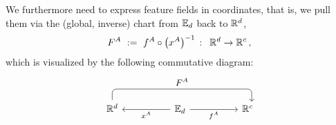 We furthermore need to express feature fields in coordinates, that is, we pull them via the (global, inverse) chart from $\mathbb{E}_d$ back to $\mathbb{R}^d$,
\begin{align}
    F^A\ :=\ f^A \circ \big(x^A \big)^{-1}\, :\,\ \mathbb{R}^d \to \mathbb{R}^c \,,
\end{align}
which is visualized by the following commutative diagram:
\begin{equation}\label{cd:feature_field_chart_pullback_Rd}
    \begin{tikzcd}[row sep=2.5em, column sep=5em]
        \R^d
            \arrow[rr, rounded corners, to path={ 
                    |- node[above, pos=.75]{\small$F^A$} ([yshift=3.ex, xshift=1ex]\tikztotarget.north)
                    -- ([xshift=1ex]\tikztotarget.north)
                    }]
        &
        \Euc_d
            \arrow[l, "x^A"]
            \arrow[r, "f^A"']
        &
        \R^c
    \end{tikzcd}
\end{equation}

